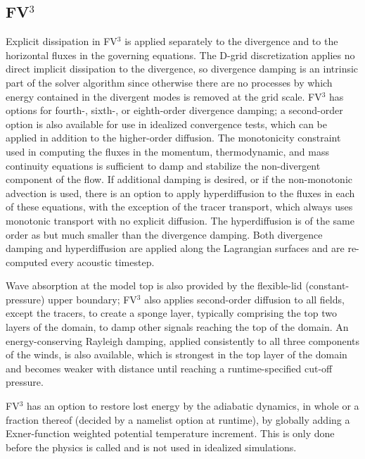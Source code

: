 \documentclass[gmd, manuscript]{copernicus}
\providecommand{\DIFadd}[1]{{\protect\color{blue}\uwave{#1}}} %
\providecommand{\DIFaddbegin}{} %
\providecommand{\DIFaddend}{} %
\begin{document}
\DIFaddend \subsection{FV$^3$}

Explicit dissipation in FV$^3$ is applied separately to the divergence and to the horizontal fluxes in the governing equations. The D-grid discretization applies no direct implicit dissipation to the divergence, so divergence damping is an intrinsic part of the solver algorithm since otherwise there are no processes by which energy contained in the divergent modes is removed at the grid scale.  FV$^3$ has options for fourth-, sixth-, or eighth-order divergence damping; a second-order option is also available for use in idealized convergence tests, which can be applied in addition to the higher-order diffusion. The monotonicity constraint used in computing the fluxes in the  momentum, thermodynamic, and mass continuity equations is sufficient to damp and stabilize the non-divergent component of the flow. If additional damping is desired, or if the non-monotonic advection is used, there is an option to apply hyperdiffusion to the fluxes in each of these equations, with the exception of the tracer transport, which always uses monotonic transport with no explicit diffusion. The hyperdiffusion is of the same order as but much smaller than the divergence damping. Both divergence damping and hyperdiffusion are applied along the Lagrangian surfaces and are re-computed every acoustic timestep.

Wave absorption at the model top is also provided by the flexible-lid (constant-pressure) upper boundary;  FV$^3$ also applies second-order diffusion to all fields, except the tracers, to create a sponge layer, typically comprising the top two layers of the domain, to damp other signals reaching the top of the domain. An energy-conserving Rayleigh damping, applied consistently to all three components of the winds, is also available, which is strongest in the top layer of the domain and becomes weaker with distance until reaching a runtime-specified cut-off pressure. 

FV$^3$ has an option to restore lost energy by the adiabatic dynamics, in whole or a fraction thereof (decided by a namelist option at runtime), by globally adding a Exner-function weighted potential temperature increment. This is only done before the physics is called and is not used in idealized simulations. 

\DIFaddbegin \subsection{\DIFadd{FVM}}
\end{document}
